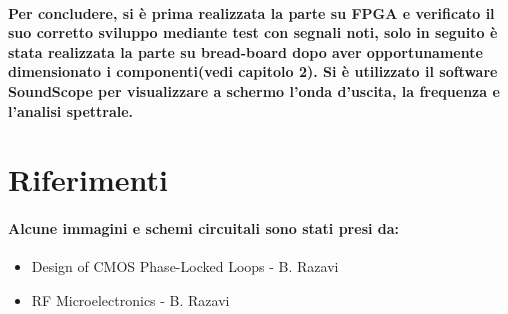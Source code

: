 \documentclass{article}
\begin{document}
\paragraph{Per concludere, si è prima realizzata la parte su FPGA e verificato il suo corretto sviluppo mediante test con segnali noti, solo in seguito è stata realizzata la parte su bread-board dopo aver opportunamente dimensionato i componenti(vedi capitolo 2).
Si è utilizzato il software SoundScope per visualizzare a schermo l'onda d'uscita, la frequenza e l'analisi spettrale.}

\newpage
\section{Riferimenti}
\paragraph{Alcune immagini e schemi circuitali sono stati presi da: }
\begin{itemize}
\item Design of CMOS Phase-Locked Loops - B. Razavi
\item RF Microelectronics - B. Razavi
\end{itemize}
\end{document}
